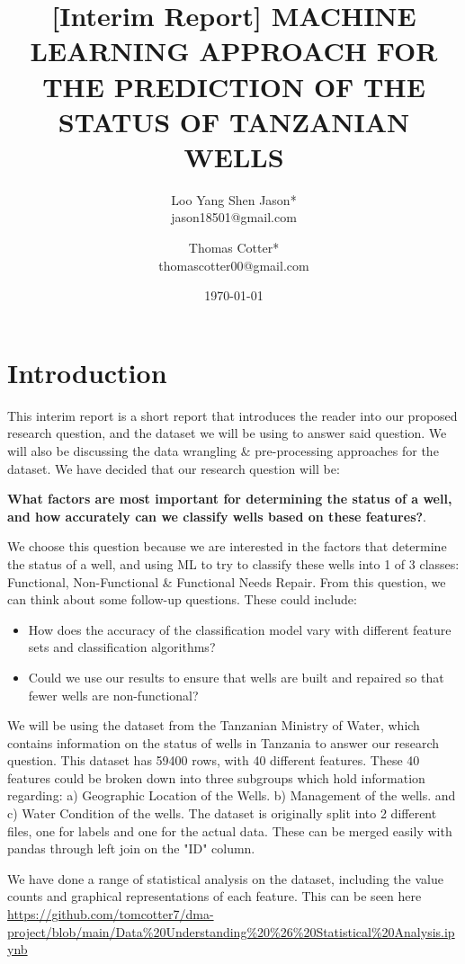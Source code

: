 \documentclass[twocolumn]{article}
\title{[Interim Report] MACHINE LEARNING APPROACH FOR THE PREDICTION OF THE STATUS OF TANZANIAN WELLS}
\author{Loo Yang Shen Jason*\\
        jason18501@gmail.com \and Thomas Cotter*\\
        thomascotter00@gmail.com}
\date{\today}
\begin{document}
    
\maketitle

\section{Introduction}
\label{sec:intro}
This interim report is a short report that introduces the reader into our proposed research question, and the dataset we will be using to answer said question. We will also be discussing the data wrangling \& pre-processing approaches for the dataset. We have decided that our research question will be: 

\textbf{What factors are most important for determining the status of a well, and how accurately can we classify wells based on these features?}. 

We choose this question because we are interested in the factors that determine the status of a well, and using ML to try to classify these wells into 1 of 3 classes: Functional, Non-Functional \& Functional Needs Repair. From this question, we can think about some follow-up questions. These could include:
    \begin{itemize}
        \item How does the accuracy of the classification model vary with different feature sets and classification algorithms?
        \item Could we use our results to ensure that wells are built and repaired so that fewer wells are non-functional?
    \end{itemize}
 
We will be using the dataset from the Tanzanian Ministry of Water, which contains information on the status of wells in Tanzania to answer our research question. This dataset has 59400 rows, with 40 different features. These 40 features could be broken down into three subgroups which hold information regarding: a) Geographic Location of the Wells. b) Management of the wells. and c) Water Condition of the wells. The dataset is originally split into 2 different files, one for labels and one for the actual data. These can be merged easily with pandas through left join on the "ID" column. 



We have done a range of statistical analysis on the dataset, including the value counts and graphical representations of each feature. This can be seen here \url{https://github.com/tomcotter7/dma-project/blob/main/Data%20Understanding%20%26%20Statistical%20Analysis.ipynb}
\end{document}
